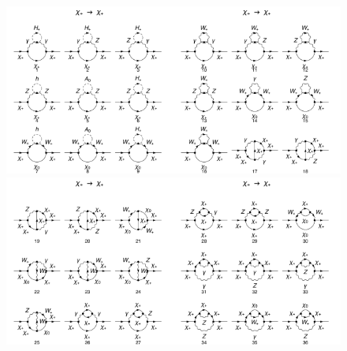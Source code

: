 \documentclass[11pt]{article}
\begin{document}
\begin{figure}[h!]
\center
\includegraphics[width=0.5\textwidth]{diagrams_F[1]_2_1.pdf}\includegraphics[width=0.5\textwidth]{diagrams_F[1]_2_2.pdf}
\includegraphics[width=0.5\textwidth]{diagrams_F[1]_2_3.pdf}\includegraphics[width=0.5\textwidth]{diagrams_F[1]_2_4.pdf}

\end{figure}
\end{document}
